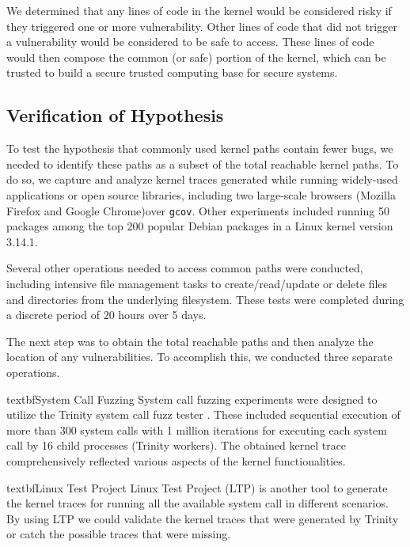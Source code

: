 We determined that any lines of code in the kernel would be considered risky
if they triggered one or more vulnerability. Other lines of code
that did not trigger a vulnerability would be considered to be safe to access.
These lines of code would then compose the common (or safe) portion of the kernel,
which can be trusted to build a secure trusted computing base for secure systems.

\subsection{Verification of Hypothesis}
\label{Verification-of-Hypothesis}

To test the hypothesis that commonly used kernel paths contain fewer bugs, we needed
to identify these paths as a subset of the total reachable kernel paths. To do so, we
capture and analyze kernel traces generated while running widely-used
applications or open source libraries, including two large-scale browsers
(Mozilla Firefox and Google Chrome)over \texttt{gcov}. Other experiments
included running 50 packages among the top 200 popular Debian packages \cite{Top-Packages}
in a Linux kernel version 3.14.1.

Several other operations needed to access common paths were conducted, including
intensive file management tasks to create/read/update or delete files and
directories from the underlying filesystem. These tests were completed
during a discrete period of 20 hours over 5 days.

The next step was to obtain the total reachable paths and then analyze the location of
any vulnerabilities. To accomplish this, we conducted three separate operations.


textbf{System Call Fuzzing}
System call fuzzing experiments were designed to utilize the Trinity
system call fuzz tester \cite{Trinity}. These included sequential execution of
more than 300 system calls with 1 million iterations
for executing each system call by 16 child processes (Trinity workers).
The obtained kernel trace comprehensively reflected various aspects of the
kernel functionalities.

textbf{Linux Test Project}
Linux Test Project (LTP) \cite{LTP} is another tool to generate the kernel traces
for running all the available system call in different scenarios.
By using LTP we could validate the kernel traces that
were generated by Trinity or catch the possible traces that were missing.

